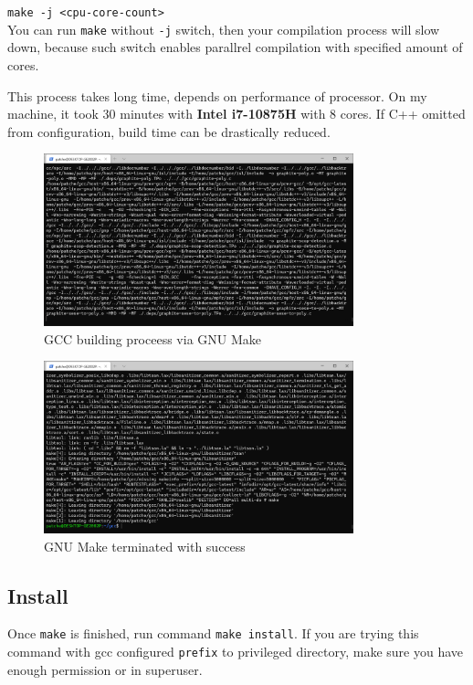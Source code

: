 \documentclass{article}
\begin{document}
\texttt{make -j <cpu-core-count>}\\

You can run \texttt{make} without \texttt{-j} switch, then your compilation process will slow down, because 
such switch enables parallrel compilation with specified amount of cores.

This process takes long time, depends on performance of processor. On my machine, it took 30 minutes 
with \textbf{Intel i7-10875H} with 8 cores. If C++ omitted from configuration, build time can be drastically reduced.

\begin{figure}[!htbp]
    \centering
    \includegraphics[width=0.8\textwidth]{images/6.png}
    \caption{GCC building proceess via GNU Make}
\end{figure}

\begin{figure}[!htbp]
    \centering
    \includegraphics[width=0.8\textwidth]{images/7.png}
    \caption{GNU Make terminated with success}
\end{figure}


\subsection{Install}

Once \texttt{make} is finished, run command \texttt{make install}. If you are trying
this command with gcc configured \texttt{prefix} to privileged directory, make sure
you have enough permission or in superuser.
\end{document}
